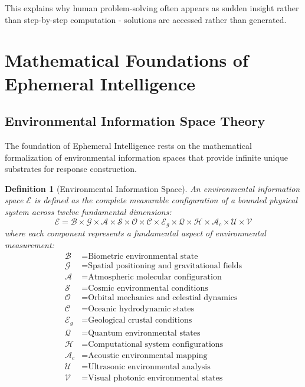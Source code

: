 \documentclass[12pt,a4paper]{article}
\newtheorem{definition}{Definition}
\begin{document}
This explains why human problem-solving often appears as sudden insight rather than step-by-step computation - solutions are accessed rather than generated.

\section{Mathematical Foundations of Ephemeral Intelligence}

\subsection{Environmental Information Space Theory}

The foundation of Ephemeral Intelligence rests on the mathematical formalization of environmental information spaces that provide infinite unique substrates for response construction.

\begin{definition}[Environmental Information Space]
An environmental information space $\mathcal{E}$ is defined as the complete measurable configuration of a bounded physical system across twelve fundamental dimensions:
\begin{equation}
\mathcal{E} = \mathcal{B} \times \mathcal{G} \times \mathcal{A} \times \mathcal{S} \times \mathcal{O} \times \mathcal{C} \times \mathcal{E}_g \times \mathcal{Q} \times \mathcal{H} \times \mathcal{A}_c \times \mathcal{U} \times \mathcal{V}
\end{equation}
where each component represents a fundamental aspect of environmental measurement:
\begin{align}
\mathcal{B} &= \text{Biometric environmental state} \\
\mathcal{G} &= \text{Spatial positioning and gravitational fields} \\
\mathcal{A} &= \text{Atmospheric molecular configuration} \\
\mathcal{S} &= \text{Cosmic environmental conditions} \\
\mathcal{O} &= \text{Orbital mechanics and celestial dynamics} \\
\mathcal{C} &= \text{Oceanic hydrodynamic states} \\
\mathcal{E}_g &= \text{Geological crustal conditions} \\
\mathcal{Q} &= \text{Quantum environmental states} \\
\mathcal{H} &= \text{Computational system configurations} \\
\mathcal{A}_c &= \text{Acoustic environmental mapping} \\
\mathcal{U} &= \text{Ultrasonic environmental analysis} \\
\mathcal{V} &= \text{Visual photonic environmental states}
\end{align}
\end{definition}
\end{document}
